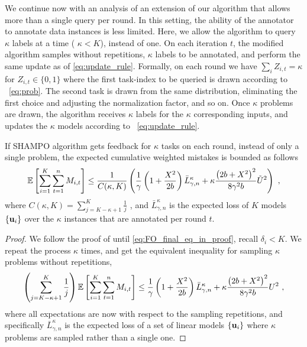 {We continue now with an analysis of an extension of our
algorithm that allows more than a single query per round. In this setting, the ability  
of the annotator to annotate data instances is less limited. Here, we
allow the algorithm to query $\kappa$ labels at a time ( $\kappa<K$), instead of one. On each
iteration $t$, the modified algorithm samples without repetitions,
$\kappa$ labels to be annotated, and perform the same update as of
\eqref{eq:update_rule}. Formally, on each round we have $\sum_i
Z_{i,t}=\kappa$ for $Z_{i,t}\in\{0,1\}$ where the first task-index to
be queried is
drawn according to ~\eqref{eq:prob}. The second task is drawn from the
same distribution, eliminating the first choice and adjusting the normalization factor, and so on. Once
$\kappa$ problems are drawn, the algorithm receives $\kappa$ labels for
the $\kappa$ corresponding inputs, and updates the $\kappa$ models
according to ~\eqref{eq:update_rule}.

\noindent
\begin{corollary}
  If SHAMPO algorithm gets feedback for $\kappa$ tasks on each round,
  instead of only a single problem, the expected cumulative weighted
  mistakes is bounded as follows
\begin{displaymath}
\mathbb{E}\left[ \sum_{i=1}^{K}\sum_{t=1}^{n}{M_{i,t}} \right] 
\le \frac{1}{C(\kappa,K)}\left({\frac{1}{\gamma}\left(1+\frac{X^2}{2b} \right){\bar L}^\kappa_{\gamma,n}
+\kappa\frac{\left({2b+X^2}\right)^2}{8{\gamma}^2b}\tilde{U}^2}\right)~,
\end{displaymath}
where $C(\kappa,K) = \sum_{j=K-\kappa+1}^{K}\frac{1}{j}$ , and
${\bar L}^\kappa_{\gamma,n}$ is the expected loss of $K$ models
$\{\mathbf{u}_{i}\}$ over the $\kappa$ instances that are annotated per round
$t$.
\end{corollary}

\noindent
\begin{proof}
We follow the proof of  until \eqref{eq:FO_final_eq_in_proof}, recall $\delta_i < K$. We
  repeat the process $\kappa$ times, and get the equivalent inequality
  for sampling $\kappa$ problems without repetitions,
\begin{equation}
\begin{split}
  \left({\sum_{j=K-\kappa+1}^{K}\frac{1}{j}}\right)\mathbb{E}\left[ \sum_{i=1}^{K}\sum_{t=1}^{n}{M_{i,t}} \right]
\le \frac{1}{\gamma}\left(1+\frac{X^2}{2b} \right){\bar L}^\kappa_{\gamma,n}
+\kappa\frac{\left({2b+X^2}\right)^2}{8{\gamma}^2b} U^2~,
\end{split}
\label{final_eq_k}
\end{equation}
where all expectations are now with respect to the sampling
repetitions, and specifically ${\bar L}^\kappa_{\gamma,n}$ is the
expected loss of a set of linear models $\{ \mathbf{u}_{i} \}$ where $\kappa$
problems are sampled rather than a single one.
\QED


\end{proof}}
